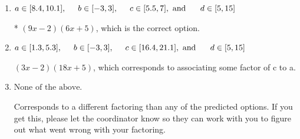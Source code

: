 \documentclass{extbook}[14pt]
\begin{document}
\begin{enumerate}
{\begin{enumerate}[label=\Alph*.]
 $(18x -2)(3x + 5)$, which corresponds to associating some factor of a to c.
\item \( a \in [8.4, 10.1], \hspace*{5mm} b \in [-3, 3], \hspace*{5mm} c \in [5.5, 7], \text{ and } \hspace*{5mm} d \in [5, 15] \)

* $(9x -2)(6x + 5)$, which is the correct option.
\item \( a \in [1.3, 5.3], \hspace*{5mm} b \in [-3, 3], \hspace*{5mm} c \in [16.4, 21.1], \text{ and } \hspace*{5mm} d \in [5, 15] \)

 $(3x -2)(18x + 5)$, which corresponds to associating some factor of c to a.
\item \( \text{None of the above.} \)

 Corresponds to a different factoring than any of the predicted options. If you get this, please let the coordinator know so they can work with you to figure out what went wrong with your factoring.
\end{enumerate}

}
\end{enumerate}
\end{document}
